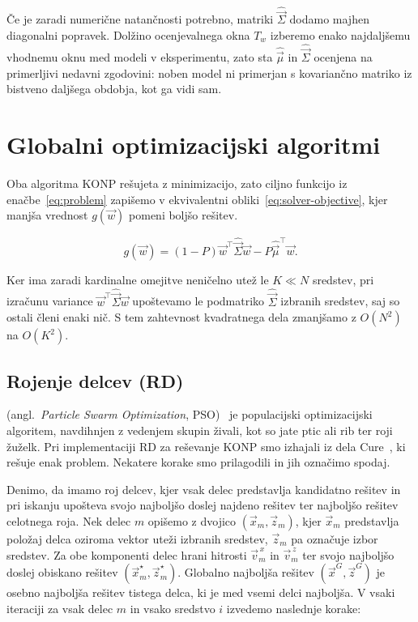 \documentclass[9pt]{style/friteza}
\begin{document}
Če je zaradi numerične natančnosti potrebno, matriki $\hat{\vec{\Sigma}}$ dodamo majhen diagonalni popravek. Dolžino ocenjevalnega okna $T_w$ izberemo enako najdaljšemu vhodnemu oknu med modeli v eksperimentu, zato sta $\hat{\vec{\mu}}$ in $\hat{\vec{\Sigma}}$ ocenjena na primerljivi nedavni zgodovini: noben model ni primerjan s kovariančno matriko iz bistveno daljšega obdobja, kot ga vidi sam. 



\clearpage
\section{Globalni optimizacijski algoritmi}\label{sec:solvers}

Oba algoritma KONP rešujeta z minimizacijo, zato ciljno funkcijo iz enačbe~\eqref{eq:problem} zapišemo v ekvivalentni obliki~\eqref{eq:solver-objective}, kjer manjša vrednost $g(\vec{w})$ pomeni boljšo rešitev.

\begin{equation}
\label{eq:solver-objective}
g(\vec{w})
=
(1-P)\vec{w}^{\top}\hat{\vec{\Sigma}}\vec{w}
-
P\hat{\vec{\mu}}^{\top}\vec{w}.
\end{equation}

Ker ima zaradi kardinalne omejitve neničelno utež le $K \ll N$ sredstev, pri izračunu variance $\vec{w}^{\top}\hat{\vec{\Sigma}}\vec{w}$ upoštevamo le podmatriko $\hat{\vec{\Sigma}}$ izbranih sredstev, saj so ostali členi enaki nič. S tem zahtevnost kvadratnega dela zmanjšamo z $O(N^2)$ na $O(K^2)$.


\subsection{Rojenje delcev (RD)}\label{sec:rd}
(angl.\ \emph{Particle Swarm Optimization}, PSO)~\cite{kennedy1995} je populacijski optimizacijski algoritem, navdihnjen z vedenjem skupin živali, kot so jate ptic ali rib ter roji žuželk. Pri implementaciji RD za reševanje KONP smo izhajali iz dela Cure~\cite{cura2009}, ki rešuje enak problem. Nekatere korake smo prilagodili in jih označimo spodaj. 

Denimo, da imamo roj delcev, kjer vsak delec predstavlja kandidatno rešitev in pri iskanju upošteva svojo najboljšo doslej najdeno rešitev ter najboljšo rešitev celotnega roja. Nek delec $m$ opišemo z dvojico $(\vec{x}_m,\vec{z}_m)$, kjer $\vec{x}_m$ predstavlja položaj delca oziroma vektor uteži izbranih sredstev, $\vec{z}_m$ pa označuje izbor sredstev. Za obe komponenti delec hrani hitrosti $\vec{v}^{\,x}_m$ in $\vec{v}^{\,z}_m$ ter svojo najboljšo doslej obiskano rešitev $(\vec{x}_m^\star,\vec{z}_m^\star)$. Globalno najboljša rešitev $(\vec{x}^G,\vec{z}^G)$ je osebno najboljša rešitev tistega delca, ki je med vsemi delci najboljša. V vsaki iteraciji za vsak delec $m$ in vsako sredstvo $i$ izvedemo naslednje korake:
\end{document}

